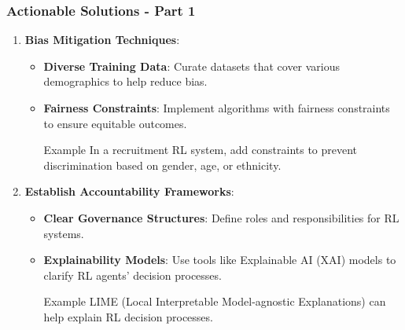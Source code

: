 \documentclass[aspectratio=169]{beamer}
\begin{document}
\begin{frame}[fragile]
    \frametitle{Actionable Solutions - Part 1}
    \begin{enumerate}
        \item \textbf{Bias Mitigation Techniques}:
          \begin{itemize}
              \item \textbf{Diverse Training Data}: Curate datasets that cover various demographics to help reduce bias.
              \item \textbf{Fairness Constraints}: Implement algorithms with fairness constraints to ensure equitable outcomes.
                \begin{block}{Example}
                    In a recruitment RL system, add constraints to prevent discrimination based on gender, age, or ethnicity.
                \end{block}
        \end{itemize}

        \item \textbf{Establish Accountability Frameworks}:
          \begin{itemize}
              \item \textbf{Clear Governance Structures}: Define roles and responsibilities for RL systems.
              \item \textbf{Explainability Models}: Use tools like Explainable AI (XAI) models to clarify RL agents’ decision processes.
                \begin{block}{Example}
                    LIME (Local Interpretable Model-agnostic Explanations) can help explain RL decision processes.
                \end{block}
          \end{itemize}
    \end{enumerate}
\end{frame}
\end{document}
